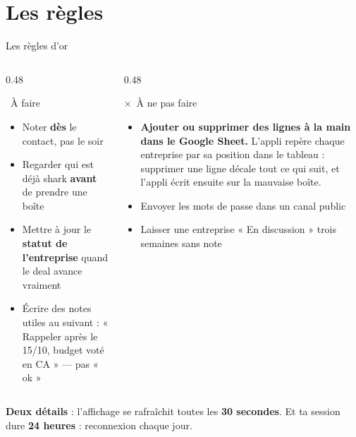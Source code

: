 \documentclass[aspectratio=169,11pt]{beamer}
\newcommand{\oui}{\textcolor{stSigne}{\checkmark}}
\newcommand{\non}{\textcolor{stRefuse}{$\times$}}
\newcommand{\cle}[1]{\textbf{\textcolor{noirApp}{#1}}}
\begin{document}
\section{Les règles}

\begin{frame}{Les règles d'or}
  \footnotesize
  \begin{columns}[T]
    \begin{column}{0.48\textwidth}
      \begin{block}{\oui~À faire}
        \begin{itemize}
          \item Noter \textbf{dès} le contact, pas le soir
          \item Regarder qui est déjà shark \textbf{avant} de prendre une boîte
          \item Mettre à jour le \textbf{statut de l'entreprise} quand le deal
                avance vraiment
          \item Écrire des notes utiles au suivant : « Rappeler après le 15/10,
                budget voté en CA » --- pas « ok »
        \end{itemize}
      \end{block}
    \end{column}
    \begin{column}{0.48\textwidth}
      \begin{alertblock}{\non~À ne pas faire}
        \begin{itemize}
          \item \textbf{Ajouter ou supprimer des lignes à la main dans le
                Google Sheet.} L'appli repère chaque entreprise par sa position
                dans le tableau : supprimer une ligne décale tout ce qui suit,
                et l'appli écrit ensuite sur la mauvaise boîte.
          \item Envoyer les mots de passe dans un canal public
          \item Laisser une entreprise « En discussion » trois semaines sans note
        \end{itemize}
      \end{alertblock}
    \end{column}
  \end{columns}

  \vfill
  {\scriptsize \cle{Deux détails} : l'affichage se rafraîchit toutes les
  \textbf{30 secondes}. Et ta session dure \textbf{24 heures} : reconnexion
  chaque jour.}
\end{frame}
\end{document}
